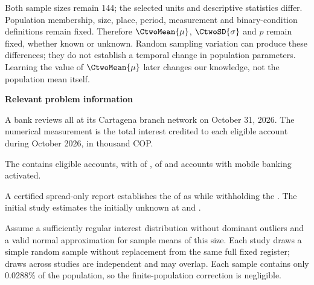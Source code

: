 Both sample sizes remain 144; the selected units and descriptive statistics differ. Population membership, size, place, period, measurement and binary-condition definitions remain fixed. Therefore $\CtwoMean{\mu}$, $\CtwoSD{\sigma}$ and $p$ remain fixed, whether known or unknown. Random sampling variation can produce these differences; they do not establish a temporal change in population parameters. Learning the value of $\CtwoMean{\mu}$ later changes our knowledge, not the population mean itself.

\secInicio[][sec:p2]

\clearpage



\textbf{Relevant problem information}

\begin{probleminfoexcerpt}
A bank reviews all      at its Cartagena branch network on October 31, 2026. The numerical measurement is the total interest credited to each eligible account during October 2026, in thousand COP.
\end{probleminfoexcerpt}

\begin{probleminfoexcerpt}
The     contains  eligible accounts, with    of   ,    of    and  accounts with mobile banking activated.
\end{probleminfoexcerpt}

\begin{probleminfoexcerpt}
A certified spread-only report establishes the    of  as    while withholding the   . The initial study estimates the initially unknown    at  and  .
\end{probleminfoexcerpt}

\begin{probleminfoexcerpt}
Assume a sufficiently regular interest distribution without dominant outliers and a valid normal approximation for sample means of this size. Each study draws a simple random sample without replacement from the same full fixed register; draws across studies are independent and may overlap. Each sample contains only 0.0288\% of the population, so the finite-population correction is negligible.
\end{probleminfoexcerpt}

